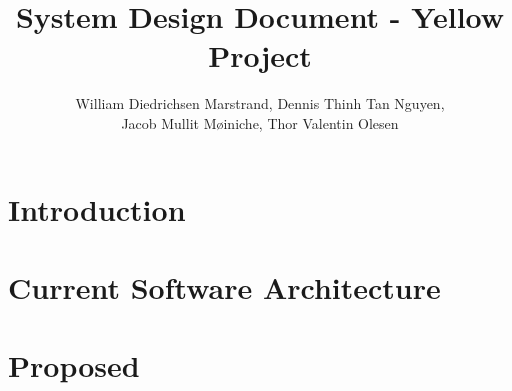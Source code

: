 \documentclass{article}
\title{System Design Document - Yellow Project}
\author{William Diedrichsen Marstrand, Dennis Thinh Tan Nguyen, 
\\Jacob Mullit Møiniche, Thor Valentin Olesen}
\begin{document}
\maketitle

\section{Introduction}
	
	

\section{Current Software Architecture}

\section{Proposed}
	
\end{document}
